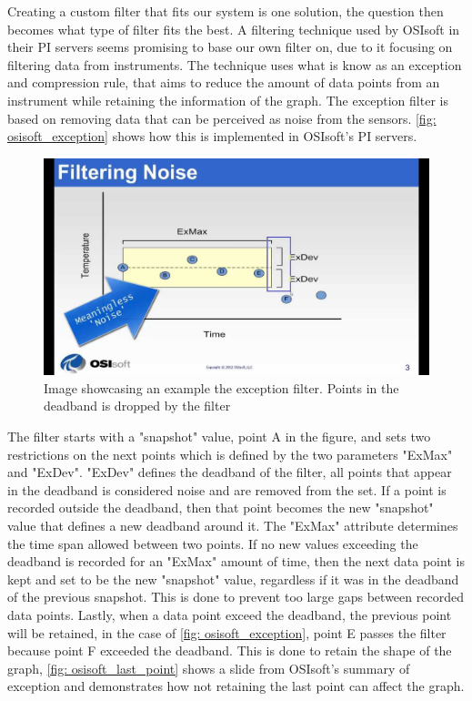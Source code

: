 \documentclass[main.tex]{subfiles}
\begin{document}
 Creating a custom filter that fits our system is one solution, the question then becomes what type of filter fits the best. A filtering technique used by OSIsoft in their PI servers seems promising to base our own filter on, due to it focusing on filtering data from instruments. The technique uses what is know as an exception and compression rule, that aims to reduce the amount of data points from an instrument while retaining the information of the graph. The exception filter is based on removing data that can be perceived as noise from the sensors. \autoref{fig: osisoft_exception} shows how this is implemented in OSIsoft's PI servers.
 
\begin{figure}[!htpb]
    \centering
    \includegraphics[width=15cm, scale=4]{images/osisoft_exception.jpg}
    \caption{Image showcasing an example the exception filter. Points in the deadband is dropped by the filter\cite{osisoft_exception}}
    \label{fig: osisoft_exception}
\end{figure}
\FloatBarrier 
 
The filter starts with a "snapshot" value, point A in the figure, and sets two restrictions on the next points which is defined by the two parameters "ExMax" and "ExDev". "ExDev" defines the deadband of the filter, all points that appear in the deadband is considered noise and are removed from the set. If a point is recorded outside the deadband, then that point becomes the new "snapshot" value that defines a new deadband around it. The "ExMax" attribute determines the time span allowed between two points. If no new values exceeding the deadband is recorded for an "ExMax" amount of time, then the next data point is kept and set to be the new "snapshot" value, regardless if it was in the deadband of the previous snapshot. This is done to prevent too large gaps between recorded data points. Lastly, when a data point exceed the deadband, the previous point will be retained, in the case of \autoref{fig: osisoft_exception}, point E passes the filter because point F exceeded the deadband. This is done to retain the shape of the graph, \autoref{fig: osisoft_last_point} shows a slide from OSIsoft's summary of exception and demonstrates how not retaining the last point can affect the graph.
\end{document}
